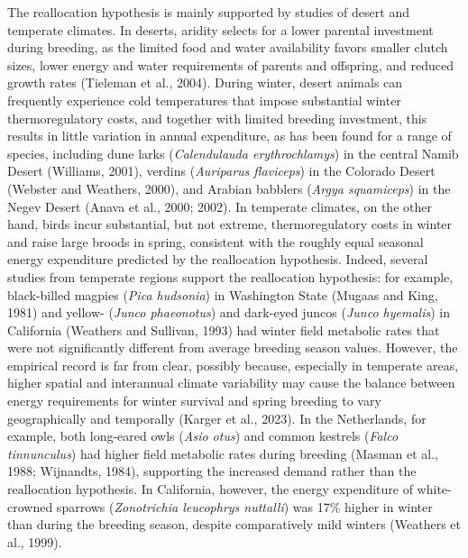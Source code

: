 \documentclass[10pt, twoside]{book} %
\begin{document}
The reallocation hypothesis is mainly supported by studies of desert and temperate climates. In deserts, aridity selects for a lower parental investment during breeding, as the limited food and water availability favors smaller clutch sizes, lower energy and water requirements of parents and offspring, and reduced growth rates (Tieleman et al., 2004). During winter, desert animals can frequently experience cold temperatures that impose substantial winter thermoregulatory costs, and together with limited breeding investment, this results in little variation in annual expenditure, as has been found for a range of species, including dune larks (\textit{Calendulauda erythrochlamys}) in the central Namib Desert (Williams, 2001), verdins (\textit{Auriparus flaviceps}) in the Colorado Desert (Webster and Weathers, 2000), and Arabian babblers (\textit{Argya squamiceps}) in the Negev Desert (Anava et al., 2000; 2002). In temperate climates, on the other hand, birds incur substantial, but not extreme, thermoregulatory costs in winter and raise large broods in spring, consistent with the roughly equal seasonal energy expenditure predicted by the reallocation hypothesis. Indeed, several studies from temperate regions support the reallocation hypothesis: for example, black-billed magpies (\textit{Pica hudsonia}) in Washington State (Mugaas and King, 1981) and yellow- (\textit{Junco phaeonotus}) and dark-eyed juncos (\textit{Junco hyemalis}) in California (Weathers and Sullivan, 1993) had winter field metabolic rates that were not significantly different from average breeding season values. However, the empirical record is far from clear, possibly because, especially in temperate areas, higher spatial and interannual climate variability may cause the balance between energy requirements for winter survival and spring breeding to vary geographically and temporally (Karger et al., 2023). In the Netherlands, for example, both long-eared owls (\textit{Asio otus}) and common kestrels (\textit{Falco tinnunculus}) had higher field metabolic rates during breeding (Masman et al., 1988; Wijnandts, 1984), supporting the increased demand rather than the reallocation hypothesis. In California, however, the energy expenditure of white-crowned sparrows (\textit{Zonotrichia leucophrys nuttalli}) was 17\% higher in winter than during the breeding season, despite comparatively mild winters (Weathers et al., 1999).\\
\end{document}
